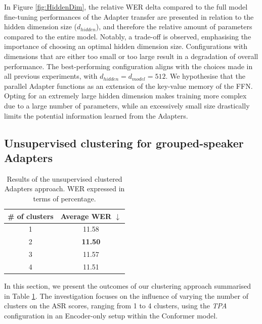 In Figure \ref{fig:HiddenDim}, the relative \ac{WER} delta compared to the full model fine-tuning performances of the Adapter transfer are presented in relation to the hidden dimension size ($d_{hidden}$), and therefore the relative amount of parameters compared to the entire model. Notably, a trade-off is observed, emphasising the importance of choosing an optimal hidden dimension size. Configurations with dimensions that are either too small or too large result in a degradation of overall performance. The best-performing configuration aligns with the choices made in all previous experiments, with $d_{hidden} = d_{model} = 512$. We hypothesise that the parallel Adapter functions as an extension of the key-value memory of the \ac{FFN}. Opting for an extremely large hidden dimension makes training more complex due to a large number of parameters, while an excessively small size drastically limits the potential information learned from the Adapters. 

\subsection{Unsupervised clustering for grouped-speaker Adapters}
\label{sec:clustering_emb}
\begin{table}[h]
    \begin{center}    
    \begin{tabular}{cc}
    \hline
      \# of clusters & Average WER $\downarrow$    \\ \hline
    \multicolumn{1}{c}{1} & 11.58  \\%
    \multicolumn{1}{c}{2} & \textbf{11.50}  \\
    \multicolumn{1}{c}{3} & 11.57  \\
    \multicolumn{1}{c}{4} & 11.51  \\ \hline 
    \end{tabular}
    \end{center}
    \caption{Results of the unsupervised clustered Adapters approach. WER expressed in terms of percentage.}
    \label{tab:res_clusters}
    \end{table}


In this section, we present the outcomes of our clustering approach summarised in Table \ref{tab:res_clusters}. The investigation focuses on the influence of varying the number of clusters on the \ac{ASR} scores, ranging from 1 to 4 clusters, using the \textit{\ac{TPA}} configuration in an Encoder-only setup within the Conformer model.

